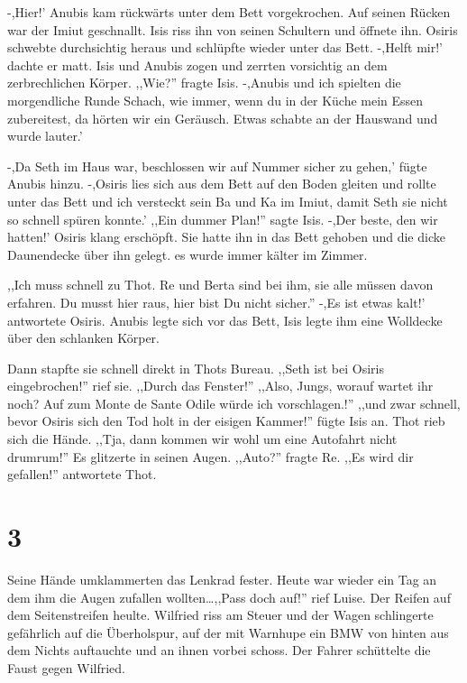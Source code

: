 -,Hier!' Anubis kam rückwärts unter dem Bett vorgekrochen. Auf seinen Rücken war der Imiut geschnallt. Isis riss ihn von seinen Schultern und öffnete ihn. Osiris schwebte durchsichtig heraus und schlüpfte wieder unter das Bett. -,Helft mir!' dachte er matt. Isis und Anubis zogen und zerrten vorsichtig an dem zerbrechlichen Körper. ,,Wie?'' fragte Isis. -,Anubis und ich spielten die morgendliche Runde Schach, wie immer, wenn du in der Küche mein Essen zubereitest, da hörten wir ein Geräusch. Etwas schabte an der Hauswand und wurde lauter.'

-,Da Seth im Haus war, beschlossen wir auf Nummer sicher zu gehen,' fügte Anubis hinzu. -,Osiris lies sich aus dem Bett auf den Boden gleiten und rollte unter das Bett und ich versteckt sein Ba und Ka im Imiut, damit Seth sie nicht so schnell spüren konnte.' ,,Ein dummer Plan!'' sagte Isis. -,Der beste, den wir hatten!' Osiris klang erschöpft. Sie hatte ihn in das Bett gehoben und die dicke Daunendecke über ihn gelegt. es wurde immer kälter im Zimmer.

,,Ich muss schnell zu Thot. Re und Berta sind bei ihm, sie alle müssen davon erfahren. Du musst hier raus, hier bist Du nicht sicher.'' -,Es ist etwas kalt!' antwortete Osiris. Anubis legte sich vor das Bett, Isis legte ihm eine Wolldecke über den schlanken Körper.

Dann stapfte sie schnell direkt in Thots Bureau. ,,Seth ist bei Osiris eingebrochen!'' rief sie. ,,Durch das Fenster!'' ,,Also, Jungs, worauf wartet ihr noch? Auf zum Monte de Sante Odile würde ich vorschlagen.!'' ,,und zwar schnell, bevor Osiris sich den Tod holt in der eisigen Kammer!'' fügte Isis an. Thot rieb sich die Hände. ,,Tja, dann kommen wir wohl um eine Autofahrt nicht drumrum!'' Es glitzerte in seinen Augen. ,,Auto?'' fragte Re. ,,Es wird dir gefallen!'' antwortete Thot.

\section*{3}

Seine Hände umklammerten das Lenkrad fester. Heute war wieder ein Tag an dem ihm die Augen zufallen wollten\dots ,,Pass doch auf!'' rief Luise. Der Reifen auf dem Seitenstreifen heulte. Wilfried riss am Steuer und der Wagen schlingerte gefährlich auf die Überholspur, auf der mit Warnhupe ein BMW von hinten aus dem Nichts auftauchte und an ihnen vorbei schoss. Der Fahrer schüttelte die Faust gegen Wilfried. 

